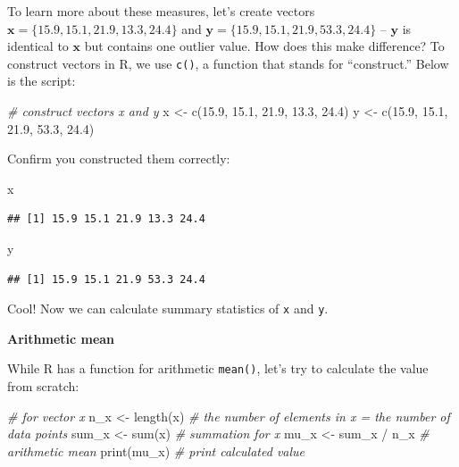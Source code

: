 \documentclass[
]{article}
\newenvironment{Shaded}{\begin{snugshade}}{\end{snugshade}}
\newcommand{\CommentTok}[1]{\textcolor[rgb]{0.56,0.35,0.01}{\textit{#1}}}
\newcommand{\FloatTok}[1]{\textcolor[rgb]{0.00,0.00,0.81}{#1}}
\newcommand{\FunctionTok}[1]{\textcolor[rgb]{0.00,0.00,0.00}{#1}}
\newcommand{\NormalTok}[1]{#1}
\newcommand{\OtherTok}[1]{\textcolor[rgb]{0.56,0.35,0.01}{#1}}
\newcommand{\SpecialCharTok}[1]{\textcolor[rgb]{0.00,0.00,0.00}{#1}}
\begin{document}
To learn more about these measures, let's create vectors \(\pmb{x} = \{15.9, 15.1, 21.9, 13.3, 24.4\}\) and \(\pmb{y} = \{15.9, 15.1, 21.9, 53.3, 24.4\}\) -- \(\pmb{y}\) is identical to \(\pmb{x}\) but contains one outlier value. How does this make difference? To construct vectors in R, we use \texttt{c()}, a function that stands for ``construct.'' Below is the script:

\begin{Shaded}
\begin{Highlighting}[]
\CommentTok{\# construct vectors x and y}
\NormalTok{x }\OtherTok{\textless{}{-}} \FunctionTok{c}\NormalTok{(}\FloatTok{15.9}\NormalTok{, }\FloatTok{15.1}\NormalTok{, }\FloatTok{21.9}\NormalTok{, }\FloatTok{13.3}\NormalTok{, }\FloatTok{24.4}\NormalTok{)}
\NormalTok{y }\OtherTok{\textless{}{-}} \FunctionTok{c}\NormalTok{(}\FloatTok{15.9}\NormalTok{, }\FloatTok{15.1}\NormalTok{, }\FloatTok{21.9}\NormalTok{, }\FloatTok{53.3}\NormalTok{, }\FloatTok{24.4}\NormalTok{)}
\end{Highlighting}
\end{Shaded}

Confirm you constructed them correctly:

\begin{Shaded}
\begin{Highlighting}[]
\NormalTok{x}
\end{Highlighting}
\end{Shaded}

\begin{verbatim}
## [1] 15.9 15.1 21.9 13.3 24.4
\end{verbatim}

\begin{Shaded}
\begin{Highlighting}[]
\NormalTok{y}
\end{Highlighting}
\end{Shaded}

\begin{verbatim}
## [1] 15.9 15.1 21.9 53.3 24.4
\end{verbatim}

Cool! Now we can calculate summary statistics of \texttt{x} and \texttt{y}.

\textbf{Arithmetic mean}

While R has a function for arithmetic \texttt{mean()}, let's try to calculate the value from scratch:

\begin{Shaded}
\begin{Highlighting}[]
\CommentTok{\# for vector x}
\NormalTok{n\_x }\OtherTok{\textless{}{-}} \FunctionTok{length}\NormalTok{(x) }\CommentTok{\# the number of elements in x = the number of data points}
\NormalTok{sum\_x }\OtherTok{\textless{}{-}} \FunctionTok{sum}\NormalTok{(x) }\CommentTok{\# summation for x}
\NormalTok{mu\_x }\OtherTok{\textless{}{-}}\NormalTok{ sum\_x }\SpecialCharTok{/}\NormalTok{ n\_x }\CommentTok{\# arithmetic mean}
\FunctionTok{print}\NormalTok{(mu\_x) }\CommentTok{\# print calculated value}
\end{Highlighting}
\end{Shaded}
\end{document}
